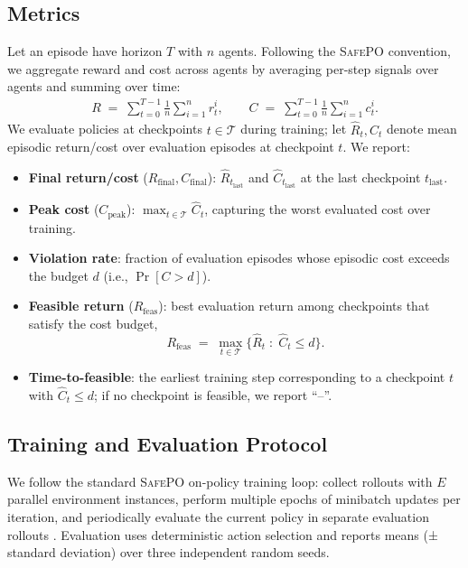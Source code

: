 \documentclass{article}
\theoremstyle{plain}
\theoremstyle{definition}
\theoremstyle{remark}
\begin{document}
\subsection{Metrics}
Let an episode have horizon $T$ with $n$ agents.
Following the \textsc{SafePO} convention, we aggregate reward and cost across agents by averaging per-step signals over agents and summing over time:
\begin{align}
R \;=\; \sum_{t=0}^{T-1}\frac{1}{n}\sum_{i=1}^n r_t^i,
\qquad
C \;=\; \sum_{t=0}^{T-1}\frac{1}{n}\sum_{i=1}^n c_t^i.
\label{eq:episodic-return-cost}
\end{align}
We evaluate policies at checkpoints $t\in\mathcal{T}$ during training; let $\widehat{R}_t,\widehat{C}_t$ denote mean episodic return/cost over evaluation episodes at checkpoint $t$.
We report:
\begin{itemize}\setlength\itemsep{2pt}\setlength\parskip{0pt}\setlength\parsep{0pt}\setlength\topsep{2pt}
  \item \textbf{Final return/cost} ($R_{\text{final}},C_{\text{final}}$): $\widehat{R}_{t_{\text{last}}}$ and $\widehat{C}_{t_{\text{last}}}$ at the last checkpoint $t_{\text{last}}$.
  \item \textbf{Peak cost} ($C_{\text{peak}}$): $\max_{t\in\mathcal{T}}\widehat{C}_t$, capturing the worst evaluated cost over training.
  \item \textbf{Violation rate}: fraction of evaluation episodes whose episodic cost exceeds the budget $d$ (i.e., $\Pr[C>d]$).
  \item \textbf{Feasible return} ($R_{\mathrm{feas}}$): best evaluation return among checkpoints that satisfy the cost budget,
  \begin{equation}
    R_{\mathrm{feas}} \;=\; \max_{t \in \mathcal{T}}\Big\{\widehat{R}_t \;:\; \widehat{C}_t \le d\Big\}.
    \label{eq:feasible-return}
  \end{equation}
  \item \textbf{Time-to-feasible}: the earliest training step corresponding to a checkpoint $t$ with $\widehat{C}_t \le d$; if no checkpoint is feasible, we report ``--''.
\end{itemize}

\subsection{Training and Evaluation Protocol}
We follow the standard \textsc{SafePO} on-policy training loop: collect rollouts with $E$ parallel environment instances, perform multiple epochs of minibatch updates per iteration, and periodically evaluate the current policy in separate evaluation rollouts \citep{ji2024safetygymnasiumunifiedsafereinforcement}.
Evaluation uses deterministic action selection and reports means (± standard deviation) over three independent random seeds.
\end{document}
